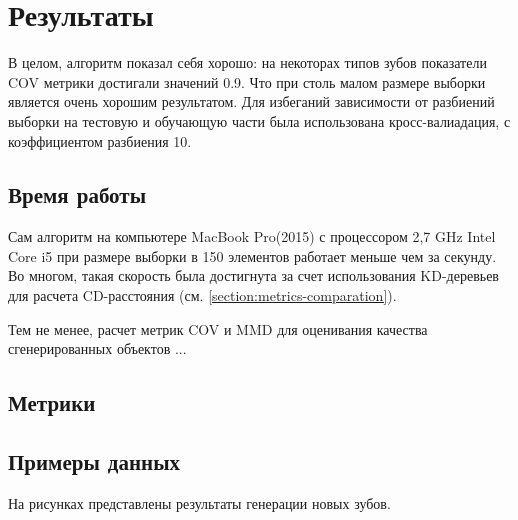 \section{Результаты} \label{section:results}

В целом, алгоритм показал себя хорошо: на некоторах типов зубов показатели COV метрики достигали значений 0.9. Что при столь малом размере выборки является очень хорошим результатом. Для избеганий зависимости от разбиений выборки на тестовую и обучающую части была использована кросс-валиадация, с коэффициентом разбиения 10.

\subsection{Время работы}

Сам алгоритм на компьютере MacBook Pro(2015) с процессором 2,7 GHz Intel Core i5 при размере выборки в 150 элементов работает меньше чем за секунду. Во многом, такая скорость была достигнута за счет использования KD-деревьев для расчета CD-расстояния (см. \ref{section:metrics-comparation}).



Тем не менее, расчет метрик COV и MMD для оценивания качества сгенерированных объектов ...

\subsection{Метрики}

\subsection{Примеры данных}
На рисунках представлены результаты генерации новых зубов.
